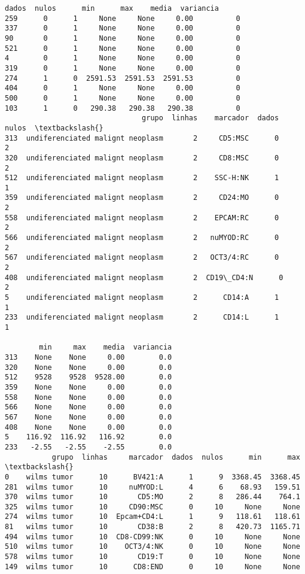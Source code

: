 \documentclass[11pt]{article}
\begin{document}
\begin{Verbatim}[commandchars=\\\{\}]
     dados  nulos      min      max    media  variancia  
259      0      1     None     None     0.00          0  
337      0      1     None     None     0.00          0  
90       0      1     None     None     0.00          0  
521      0      1     None     None     0.00          0  
4        0      1     None     None     0.00          0  
319      0      1     None     None     0.00          0  
274      1      0  2591.53  2591.53  2591.53          0  
404      0      1     None     None     0.00          0  
500      0      1     None     None     0.00          0  
103      1      0   290.38   290.38   290.38          0  
                                grupo  linhas    marcador  dados  nulos  \textbackslash{}
313  undiferenciated malignt neoplasm       2     CD5:MSC      0      2   
320  undiferenciated malignt neoplasm       2     CD8:MSC      0      2   
512  undiferenciated malignt neoplasm       2    SSC-H:NK      1      1   
359  undiferenciated malignt neoplasm       2     CD24:MO      0      2   
558  undiferenciated malignt neoplasm       2    EPCAM:RC      0      2   
566  undiferenciated malignt neoplasm       2   nuMYOD:RC      0      2   
567  undiferenciated malignt neoplasm       2   OCT3/4:RC      0      2   
408  undiferenciated malignt neoplasm       2  CD19\_CD4:N      0      2   
5    undiferenciated malignt neoplasm       2      CD14:A      1      1   
233  undiferenciated malignt neoplasm       2      CD14:L      1      1   

        min     max    media  variancia  
313    None    None     0.00        0.0  
320    None    None     0.00        0.0  
512    9528    9528  9528.00        0.0  
359    None    None     0.00        0.0  
558    None    None     0.00        0.0  
566    None    None     0.00        0.0  
567    None    None     0.00        0.0  
408    None    None     0.00        0.0  
5    116.92  116.92   116.92        0.0  
233   -2.55   -2.55    -2.55        0.0  
           grupo  linhas     marcador  dados  nulos      min      max  \textbackslash{}
0    wilms tumor      10      BV421:A      1      9  3368.45  3368.45   
281  wilms tumor      10     nuMYOD:L      4      6    68.93   159.51   
370  wilms tumor      10       CD5:MO      2      8   286.44    764.1   
325  wilms tumor      10     CD90:MSC      0     10     None     None   
274  wilms tumor      10  Epcam+CD4:L      1      9   118.61   118.61   
81   wilms tumor      10       CD38:B      2      8   420.73  1165.71   
494  wilms tumor      10  CD8-CD99:NK      0     10     None     None   
510  wilms tumor      10    OCT3/4:NK      0     10     None     None   
578  wilms tumor      10       CD19:T      0     10     None     None   
149  wilms tumor      10      CD8:END      0     10     None     None   


\end{Verbatim}
\end{document}
